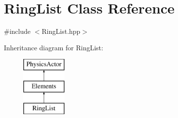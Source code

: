 \hypertarget{class_ring_list}{\section{Ring\+List Class Reference}
\label{class_ring_list}
}


{\ttfamily \#include $<$Ring\+List.\+hpp$>$}

Inheritance diagram for Ring\+List\+:\begin{figure}[H]
\begin{center}
\leavevmode
\includegraphics[height=3.000000cm]{class_ring_list}
\end{center}
\end{figure}
